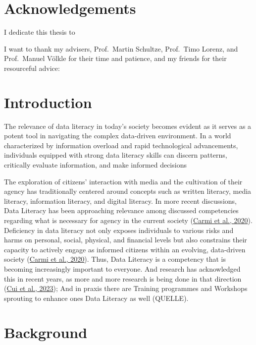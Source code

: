 \documentclass[
  12pt,
  a4paper,
  twoside]{article}
\begin{document}
\hypertarget{acknowledgements}{%
\section*{Acknowledgements}\label{acknowledgements}}

I dedicate this thesis to

I want to thank my advisers, Prof.~Martin Schultze, Prof.~Timo Lorenz, and Prof.~Manuel Völkle for their time and patience, and my friends for their resourceful advice:

\newpage\null\thispagestyle{empty}\newpage

\hypertarget{introduction}{%
\section{Introduction}\label{introduction}}

The relevance of data literacy in today's society becomes evident as it serves as a potent tool in navigating the complex data-driven environment. In a world characterized by information overload and rapid technological advancements, individuals equipped with strong data literacy skills can discern patterns, critically evaluate information, and make informed decisions

The exploration of citizens' interaction with media and the cultivation of their agency has traditionally centered around concepts such as written literacy, media literacy, information literacy, and digital literacy. In more recent discussions, Data Literacy has been approaching relevance among discussed competencies regarding what is necessary for agency in the current society (\protect\hyperlink{ref-Carmi2020}{Carmi et al., 2020}). Deficiency in data literacy not only exposes individuals to various risks and harms on personal, social, physical, and financial levels but also constrains their capacity to actively engage as informed citizens within an evolving, data-driven society (\protect\hyperlink{ref-Carmi2020}{Carmi et al., 2020}). Thus, Data Literacy is a competency that is becoming increasingly important to everyone. And research has acknowledged this in recent years, as more and more research is being done in that direction (\protect\hyperlink{ref-Cui2023}{Cui et al., 2023}); And in praxis there are Training programmes and Workshops sprouting to enhance ones Data Literacy as well (QUELLE).

\hypertarget{background}{%
\section{Background}\label{background}}
\end{document}
